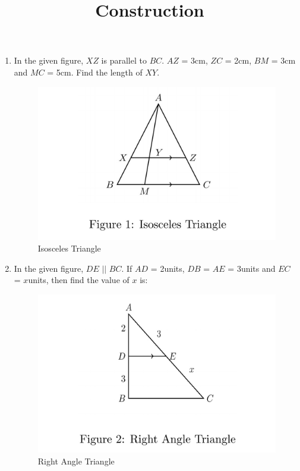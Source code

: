 \documentclass{article}
\title{\textbf{Construction}}
\date{}
\begin{document}
\maketitle

\begin{enumerate}
	\item In the given figure, $XZ$ is parallel to $BC$. $AZ$ = 3cm, $ZC$ = 2cm, $BM$ = 3cm and $MC$ = 5cm. Find the length of $XY$.
		\begin{figure}[h!]
			\centering
			\includegraphics [width=\columnwidth] {figs/fig1.jpg}
			\caption{Isosceles Triangle}
			\label{fig:fig1.jpg}
		\end{figure}

	\item In the given figure, $DE$ $||$ $BC$. If $AD$ = 2units, $DB$ = $AE$ = 3units and $EC$ = $x$units, then find the value of $x$ is:\\

		\begin{figure}[h!]
			\centering
			\includegraphics [width=\columnwidth] {figs/fig2.jpg}
			\caption{Right Angle Triangle}
			\label{fig:fig2.jpg}
		\end{figure}


\end{enumerate}
\end{document}

